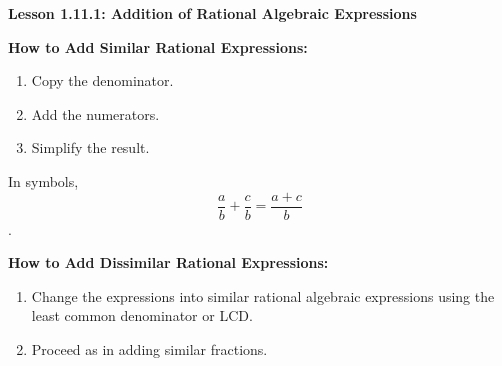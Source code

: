 \begin{center}
\textbf{Lesson 1.11.1: Addition of Rational Algebraic Expressions}
\end{center}


\textbf{How to Add Similar Rational Expressions:}
\begin{enumerate} 
	\item Copy the denominator. 
	\item Add the numerators.  
	\item Simplify the result. 
\end{enumerate}

In symbols, 
\vspace*{-0.5ex}
$$ \displaystyle  \frac{a}{b} +  \frac{c}{b} =  \frac{a+c}{b} $$.

\vspace*{-3ex}
\textbf{How to Add Dissimilar Rational Expressions:}
\begin{enumerate} 
	\item Change the expressions into similar rational algebraic expressions using the least common denominator  or  LCD.  
	\item Proceed as in adding similar fractions.  
\end{enumerate}



